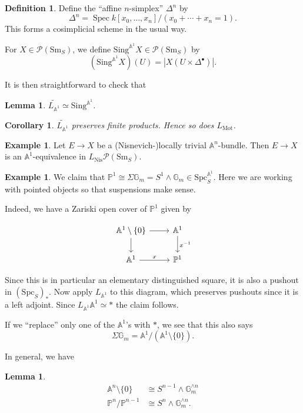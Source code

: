 \documentclass{shortart}
\newtheorem{lemma}[thm]{Lemma}
\newtheorem{cor}[thm]{Corollary}
\theoremstyle{definition}
\newtheorem{defi}[thm]{Definition}
\newtheorem{eg}[thm]{Example}
\newcommand\Sm{\mathrm{Sm}}
\newcommand\Spc{\mathrm{Spc}}
\newcommand\Sing{\mathrm{Sing}}
\newcommand\Nis{\mathrm{Nis}}
\newcommand\Pre{\mathcal{P}}
\renewcommand\P{\mathbb{P}}
\newcommand\A{\mathbb{A}}
\newcommand\G{\mathbb{G}}
\newcommand\Mot{\mathrm{Mot}}
\DeclareMathOperator\Spec{Spec}
\begin{document}
\begin{defi}
  Define the ``affine $n$-simplex'' $\Delta^n$ by
  \[
    \Delta^n = \Spec k[x_0, \ldots, x_n]/(x_0 + \cdots + x_n = 1).
  \]
  This forms a cosimplicial scheme in the usual way.

  For $X \in \Pre(\Sm_S)$, we define $\Sing^{\A^1}X \in \Pre(\Sm_S)$ by
  \[
    (\Sing^{\A^1}X)(U) = |X(U \times \Delta^\bullet)|.
  \]
\end{defi}

It is then straightforward to check that
\begin{lemma}
  $\widetilde{L_{\A^1}} \simeq \Sing^{\A^1}$.
\end{lemma}

\begin{cor}
  $\widetilde{L_{\A^1}}$ preserves finite products. Hence so does $L_{\Mot}$.
\end{cor}

\begin{eg}
  Let $E \to X$ be a (Nisnevich-)locally trivial $\A^n$-bundle. Then $E \to X$ is an $\A^1$-equivalence in $L_{\Nis}\Pre(\Sm_S)$.
\end{eg}

\begin{eg}
  We claim that $\P^1 \cong \Sigma \G_m = S^1 \wedge \G_m \in \Spc_S^{\A^1}$. Here we are working with pointed objects so that suspensions make sense.

  Indeed, we have a Zariski open cover of $\P^1$ given by
  \begin{useimager}
    \[
      \begin{tikzcd}
        \A^1 \setminus \{0\} \ar[r] \ar[d] & \A^1 \ar[d, "x^{-1}"]\\
        \A^1 \ar[r, "x"] & \P^1
      \end{tikzcd}
    \]
  \end{useimager}
  Since this is in particular an elementary distinguished square, it is also a pushout in $(\Spc_S)_*$. Now apply $L_{\A^1}$ to this diagram, which preserves pushouts since it is a left adjoint. Since $L_{\A^1} \A^1 \simeq *$ the claim follows.

  If we ``replace'' only one of the $\A^1$'s with $*$, we see that this also says
  \[
    \Sigma \G_m = \A^1 / (\A^1 \setminus \{0\}).
  \]
\end{eg}

In general, we have
\begin{lemma}
  \[
    \begin{aligned}
      \A^n \setminus \{0\} &\cong S^{n - 1} \wedge \G_m^{\wedge n}\\
      \P^n / \P^{n - 1} &\cong S^n \wedge \G_m^{\wedge n}.
    \end{aligned}
  \]
\end{lemma}
\end{document}
